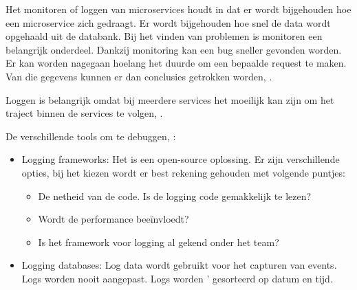 Het monitoren of loggen van microservices houdt in dat er wordt bijgehouden hoe een microservice zich gedraagt. Er wordt bijgehouden hoe snel de data wordt opgehaald uit de databank. Bij het vinden van problemen is monitoren een belangrijk onderdeel. Dankzij monitoring kan een bug sneller gevonden worden. Er kan worden nagegaan hoelang het duurde om een bepaalde request te maken. Van die gegevens kunnen er dan conclusies getrokken worden, \textcite{Ananthasubramanian2018}.

Loggen is belangrijk omdat bij meerdere services het moeilijk kan zijn om het traject binnen de services te volgen, \textcite{Saldanha2016}.

De verschillende tools om te debuggen, \textcite{Swersky2019}:
\begin{itemize}
	\item Logging frameworks: Het is een open-source oplossing. Er zijn verschillende opties, bij het kiezen wordt er best rekening gehouden met volgende puntjes:
		\begin{itemize}
			\item De netheid van de code. Is de logging code gemakkelijk te lezen?
			\item Wordt de performance beeïnvloedt?
			\item Is het framework voor logging al gekend onder het team?
		\end{itemize}
	\item Logging databases: Log data wordt gebruikt voor het capturen van events. Logs worden nooit aangepast. Logs worden ' gesorteerd op datum en tijd. 
\end{itemize}



